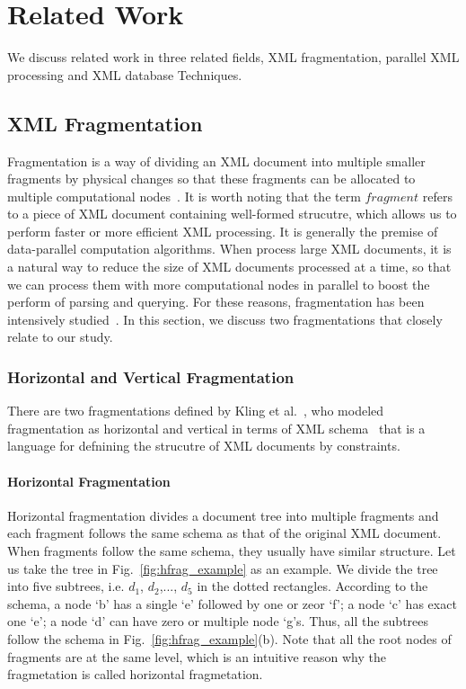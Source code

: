 \chapter{Related Work} 
\label{cht:relatedwork}

We discuss related work in three related fields, XML fragmentation,
parallel XML processing and XML database Techniques.

\section{XML Fragmentation}

Fragmentation is a way of dividing an XML document into multiple smaller
fragments by physical changes so that these fragments can be allocated to
multiple computational nodes~\cite{BrMa14}. It is worth noting that the term
$fragment$ refers to a piece of XML document containing well-formed strucutre,
which allows us to perform faster or more efficient XML processing. It is
generally the premise of data-parallel computation algorithms. When process
large XML documents, it is a natural way to reduce the size of XML documents
processed at a time, so that we can process them with more computational nodes
in parallel to boost the perform of parsing and querying. For these reasons,
fragmentation has been intensively studied~\cite{ARBM06,DaGP14, CFKL12,NEMH07,
	OgTP13,LiZZ17, CFKL12,DaGP14}. In this section, we discuss  two fragmentations
that closely relate to our study.


\subsection{Horizontal and Vertical Fragmentation}
\label{sec:hfragment}

There are two fragmentations defined by Kling et al.~\cite{kling11:dist_xml},
who modeled fragmentation as horizontal and vertical in terms of XML
schema~\cite{schema} that is a language for defnining the strucutre of XML
documents by constraints.

\subsubsection{Horizontal Fragmentation}
\label{sec:vfragment}

Horizontal fragmentation divides a document tree into multiple fragments and
each fragment follows the same schema as that of the original XML document. When
fragments follow the same schema, they usually have similar structure.  Let us
take the tree in Fig.~\ref{fig:hfrag_example} as an example. We divide the tree
into five subtrees, i.e. $d_1$, $d_2$,..., $d_5$ in the dotted rectangles.
According to the schema, a node `b' has a single `e' followed by one or zeor
`f'; a node `c' has exact one `e'; a node `d' can have zero or multiple node
`g's. Thus, all the subtrees follow the schema in
Fig.~\ref{fig:hfrag_example}(b). Note that all the root nodes of fragments are
at the same level, which is an intuitive reason why the fragmetation is called
horizontal fragmetation.



